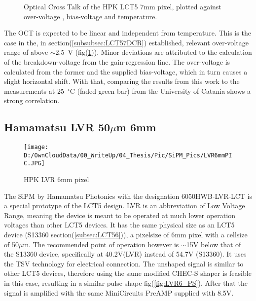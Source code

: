 \documentclass[12pt,article,type=msc,colorback,accentcolor=tud9c]{tudthesis}
\begin{document}
\begin{figure}[h!]
\begin{centering}
\caption[LCT5 7mm OCT]{Optical Cross Talk of the HPK LCT5 7mm pixel, plotted against over-voltage , bias-voltage and temperature.}
\label{fig:LCT57_OCT}
\end{centering}
\end{figure}
The OCT is expected to be linear and independent from temperature. This is the case in the, in section(\ref{subsubsec:LCT57DCR}) established, relevant over-voltage range of above $\sim$2.5~V (fig(\ref{fig:LCT57_OCT})). Minor deviations are attributed to the calculation of the breakdown-voltage from the gain-regression line. The over-voltage is calculated from the former and the supplied bias-voltage, which in turn causes a slight horizontal shift. With that, comparing the results from this work to the measurements at 25~$^\circ$C (faded green bar) from the University of Catania shows a strong correlation.



\clearpage

\subsection{Hamamatsu LVR 50$\mu$m 6mm}
\begin{wrapfigure}{R}{0.4\textwidth}
\centering
\texttt{[image: D:/OwnCloudData/00\_WriteUp/04\_Thesis/Pic/SiPM\_Pics/LVR6mmPIC.JPG]}
\caption[LCT5 LVR 6mm SiPM]{\label{fig:LVR6_pixel}HPK LVR 6mm pixel}
\end{wrapfigure}

The SiPM by Hamamatsu Photonics with the designation 6050HWB-LVR-LCT is a special prototype of the LCT5 design. LVR is an abbreviation of Low Voltage Range, meaning the device is meant to be operated at much lower operation voltages than other LCT5 devices. It has the same physical size as an LCT5 device (S13360 section(\ref{subsec:LCT56})), a pixelsize of 6mm pixel with a cellsize of 50$\mu$m. The recommended point of operation however is $\sim$15V below that of the S13360 device, specifically at 40.2V(LVR) instead of 54.7V (S13360). It uses the TSV technology for electrical connection. The unshaped signal is similar to other LCT5 devices, therefore using the same modified CHEC-S shaper is feasible in this case, resulting in a similar pulse shape fig(\ref{fig:LVR6_PS}). After that the signal is amplified with the same MiniCircuits PreAMP supplied with 8.5V.
\\
\end{document}
